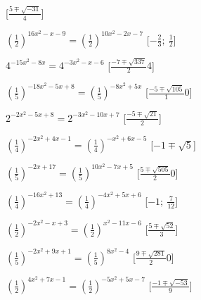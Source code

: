 \begin{esercizio}
\begin{enumeratea}
   \hfill [\(\frac{5 \mp \sqrt{-31}} 4\)]
  \item  \(\left(\frac{1}{2}\right)^{16 x^2 - x -9} = 
\left(\frac{1}{2}\right)^{10 x^2 -2 x -7}\)
   \hfill [\(-\frac{2}{3};~\frac{1}{2}\)]
  \item  \(4^{-15 x^2 -8 x } = 4^{-3 x^2 - x -6}\)
   \hfill [\(\frac{-7 \mp \sqrt{337}} 24\)]
  \item  \(\left(\frac{1}{5}\right)^{-18 x^2 -5 x +8} = 
\left(\frac{1}{5}\right)^{-8 x^2 +5 x }\)
   \hfill [\(\frac{-5 \mp \sqrt{105}} 10\)]
  \item  \(2^{-2 x^2 -5 x +8} = 2^{-3 x^2 -10 x +7}\)
   \hfill [\(\frac{-5 \mp \sqrt{21}} 2\)]
  \item  \(\left(\frac{1}{4}\right)^{-2 x^2 +4 x -1} = 
\left(\frac{1}{4}\right)^{- x^2 +6 x -5}\)
   \hfill [\(-1 \mp \sqrt{5}\)]
  \item  \(\left(\frac{1}{5}\right)^{-2 x +17} = \left(\frac{1}{5}\right)^{10 
x^2 -7 x +5}\)
   \hfill [\(\frac{5 \mp \sqrt{505}} 20\)]
  \item  \(\left(\frac{1}{4}\right)^{-16 x^2 +13} = \left(\frac{1}{4}\right)^{-4 
x^2 +5 x +6}\)
   \hfill [\(-1;~\frac{7}{12}\)]
  \item  \(\left(\frac{1}{2}\right)^{-2 x^2 - x +3} = 
\left(\frac{1}{2}\right)^{x^2 -11 x -6}\)
   \hfill [\(\frac{5 \mp \sqrt{52}} 3\)]
  \item  \(\left(\frac{1}{5}\right)^{-2 x^2 +9 x +1} = 
\left(\frac{1}{5}\right)^{8 x^2 -4}\)
   \hfill [\(\frac{9 \mp \sqrt{281}} 20\)]
  \item  \(\left(\frac{1}{2}\right)^{4 x^2 +7 x -1} = 
\left(\frac{1}{2}\right)^{-5 x^2 +5 x -7}\)
   \hfill [\(\frac{-1 \mp \sqrt{-53}} 9\)]
 \end{enumeratea}
\end{esercizio}


